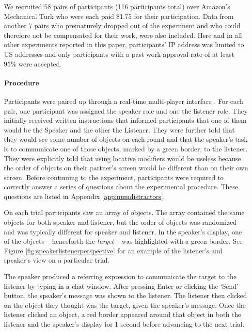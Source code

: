 \documentclass[11pt]{article}
\newcommand{\figref}[1]{Figure \ref{#1}}
\newcommand{\appref}[1]{Appendix \ref{#1}}
\begin{document}
We recruited 58 pairs of participants (116 participants total) over Amazon's Mechanical Turk who were each paid \$1.75 for their participation. Data from another 7 pairs who prematurely dropped out of the experiment and who could therefore not be compensated for their work, were also included. Here and in all other experiments reported in this paper, participants' IP address was limited to US addresses and only participants with a past work approval rate of at least 95\% were accepted. 

\paragraph{Procedure}

Participants were paired up through a real-time multi-player interface \cite{Hawkins15_RealTimeWebExperiments}. For each pair, one participant was assigned the speaker role and one the listener role. They  initially received written instructions that informed participants that one of them would be the Speaker and the other the Listener. They were further told that they would see some number of objects on each round and that the speaker's task is to communicate one of those objects, marked by a green border, to the listener. They were explicitly told that using locative modifiers would be useless because the order of objects on their partner's screen would be different than on their own screen. Before continuing to the experiment, participants were required to correctly answer a series of questions about the experimental procedure. These questions are listed in \appref{app:numdistractors}.

On each trial participants saw an array of objects. The array contained the same objects for both speaker and listener, but the order of objects was randomized and was typically different for speaker and listener. In the speaker's display, one of the objects -- henceforth the \emph{target} -- was highlighted with a green border. See \figref{fig:speakerlistenerperspective} for an example of the listener's and speaker's view on a particular trial.

The speaker produced a referring expression to communicate the target to the listener by typing in a chat window. After pressing Enter or clicking the `Send' button, the speaker's message was shown to the listener. The listener then clicked on the object they thought was the target, given the speaker's message.  Once the listener clicked an object, a red border appeared around that object in both the listener and the speaker's display for 1 second before advancing to the next trial.
\end{document}
